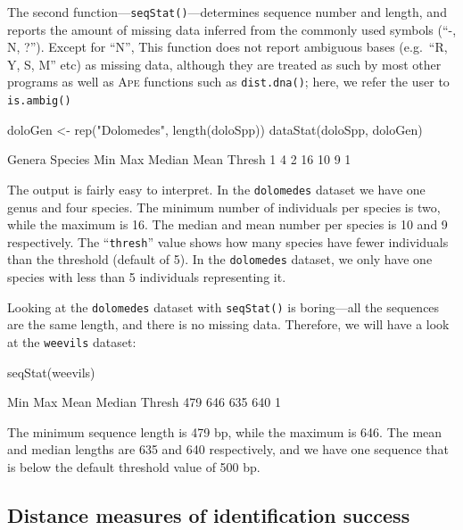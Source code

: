 \documentclass{article}
\newcommand{\progname}[1]{\textsc{#1}}
\newcommand{\fun}[1]{\texttt{#1}}
\begin{document}
The second function---\fun{seqStat()}---determines sequence number and length, and reports the amount of missing data inferred from the commonly used symbols (``-, N, ?''). Except for ``N'', This function does not report ambiguous bases (e.g.\ ``R, Y, S, M'' etc)  as missing data, although they are treated as such by most other programs as well as \progname{Ape} functions such as \fun{dist.dna()}; here, we refer the user to \fun{is.ambig()}

\begin{console}
doloGen <- rep("Dolomedes", length(doloSpp))
dataStat(doloSpp, doloGen)
\end{console}

\begin{Routput}
 Genera Species     Min     Max  Median    Mean  Thresh 
      1       4       2      16      10       9       1 
\end{Routput}

The output is fairly easy to interpret. In the \fun{dolomedes} dataset we have one genus and four species. The minimum number of individuals per species is two, while the maximum is 16. The median and mean number per species is 10 and 9 respectively. The ``\fun{thresh}'' value shows how many species have fewer individuals than the threshold (default of 5). In the \fun{dolomedes} dataset, we only have one species with less than 5 individuals representing it.

Looking at the \fun{dolomedes} dataset with \fun{seqStat()} is boring---all the sequences are the same length, and there is no missing data. Therefore, we will have a look at the \fun{weevils} dataset:

\begin{console}
seqStat(weevils)
\end{console}

\begin{Routput}
   Min    Max   Mean Median Thresh 
   479    646    635    640      1
\end{Routput}

The minimum sequence length is 479 bp, while the maximum is 646. The mean and median lengths are 635 and 640 respectively, and we have one sequence that is below the default threshold value of 500 bp.


\subsection{Distance measures of identification success}
\end{document}
